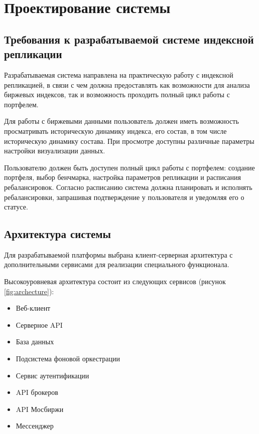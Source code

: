 \documentclass[14pt]{gost-7-32}
\begin{document}
\newpage
\section{Проектирование системы}

\subsection{Требования к разрабатываемой системе индексной репликации}

Разрабатываемая система направлена на практическую работу с индексной репликацией, в связи с чем должна предоставлять как возможности для анализа биржевых индексов, так и возможность проходить полный цикл работы с портфелем.

Для работы с биржевыми данными пользователь должен иметь возможность просматривать историческую динамику индекса, его состав, в том числе историческую динамику состава. При просмотре доступны различные параметры настройки визуализации данных.

Пользователю должен быть доступен полный цикл работы с портфелем: создание портфеля, выбор бенчмарка, настройка параметров репликации и расписания ребалансировок. Согласно расписанию система должна планировать и исполнять ребалансировки, запрашивая подтверждение у пользователя и уведомляя его о статусе.

\subsection{Архитектура системы}

Для разрабатываемой платформы выбрана клиент-серверная архитектура с дополнительными сервисами для реализации специального функционала.


Высокоуровневая архитектура состоит из следующих сервисов (рисунок \ref{fig:archecture}):

\begin{itemize}
  \item Веб-клиент
  \item Серверное API
  \item База данных
  \item Подсистема фоновой оркестрации
  \item Сервис аутентификации
  \item API брокеров
  \item API Мосбиржи
  \item Мессенджер
\end{itemize}
\end{document}
